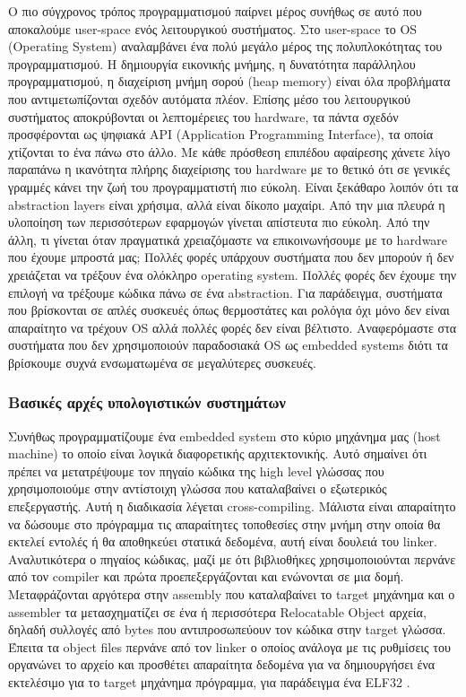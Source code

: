 Ο πιο σύγχρονος τρόπος προγραμματισμού παίρνει μέρος συνήθως σε αυτό
που αποκαλούμε user-space ενός λειτουργικού συστήματος.  Στο
user-space το OS (Operating System) αναλαμβάνει ένα πολύ μεγάλο μέρος
της πολυπλοκότητας του προγραμματισμού. Η δημιουργία εικονικής μνήμης,
η δυνατότητα παράλληλου προγραμματισμού, η διαχείριση μνήμη σορού
(heap memory) είναι όλα προβλήματα που αντιμετωπίζονται σχεδόν
αυτόματα πλέον. Επίσης μέσο του λειτουργικού συστήματος αποκρύβονται
οι λεπτομέρειες του hardware, τα πάντα σχεδόν προσφέρονται ως ψηφιακά
API (Application Programming Interface), τα οποία χτίζονται το ένα
πάνω στο άλλο.  Με κάθε πρόσθεση επιπέδου αφαίρεσης χάνετε λίγο
παραπάνω η ικανότητα πλήρης διαχείρισης του hardware με το θετικό ότι
σε γενικές γραμμές κάνει την ζωή του προγραμματιστή πιο εύκολη. Είναι
ξεκάθαρο λοιπόν ότι τα abstraction layers είναι χρήσιμα, αλλά είναι
δίκοπο μαχαίρι. Από την μια πλευρά η υλοποίηση των περισσότερων
εφαρμογών γίνεται απίστευτα πιο εύκολη. Από την άλλη, τι γίνεται όταν
πραγματικά χρειαζόμαστε να επικοινωνήσουμε με το hardware που έχουμε
μπροστά μας;
Πολλές φορές υπάρχουν συστήματα που δεν μπορούν ή δεν χρειάζεται
να τρέξουν ένα ολόκληρο operating system. Πολλές φορές δεν έχουμε την
επιλογή να τρέξουμε κώδικα πάνω σε ένα abstraction. Για παράδειγμα,
συστήματα που βρίσκονται σε απλές συσκευές όπως θερμοστάτες και
ρολόγια όχι μόνο δεν είναι απαραίτητο να τρέχουν OS αλλά πολλές φορές
δεν είναι βέλτιστο. 
Αναφερόμαστε στα συστήματα που δεν χρησιμοποιούν παραδοσιακά OS  ως
embedded systems διότι τα βρίσκουμε συχνά ενσωματωμένα σε μεγαλύτερες συσκευές.

\subsubsection{Βασικές αρχές υπολογιστικών συστημάτων}

Συνήθως προγραμματίζουμε ένα embedded system στο κύριο μηχάνημα μας
(host machine) το οποίο είναι λογικά διαφορετικής αρχιτεκτονικής. Αυτό
σημαίνει ότι πρέπει να μετατρέψουμε τον πηγαίο κώδικα της high level
γλώσσας που χρησιμοποιούμε στην αντίστοιχη γλώσσα που καταλαβαίνει ο
εξωτερικός επεξεργαστής. Αυτή η διαδικασία λέγεται
cross-compiling. Μάλιστα είναι απαραίτητο να δώσουμε στο πρόγραμμα τις
απαραίτητες τοποθεσίες στην μνήμη στην οποία θα εκτελεί εντολές ή θα
αποθηκεύει στατικά δεδομένα, αυτή είναι δουλειά του
linker. Αναλυτικότερα ο πηγαίος κώδικας, μαζί
με ότι βιβλιοθήκες χρησιμοποιούνται περνάνε από τον compiler και
πρώτα προεπεξεργάζονται και ενώνονται σε μια δομή.
Μεταφράζονται αργότερα στην assembly που καταλαβαίνει το target
μηχάνημα και ο assembler τα μετασχηματίζει σε ένα ή περισσότερα
Relocatable Object αρχεία, δηλαδή συλλογές από bytes που
αντιπροσωπεύουν τον κώδικα στην target γλώσσα. Έπειτα τα object files
περνάνε από τον linker ο οποίος ανάλογα με τις ρυθμίσεις του οργανώνει
το αρχείο και προσθέτει απαραίτητα δεδομένα για να δημιουργήσει ένα
εκτελέσιμο για το target μηχάνημα πρόγραμμα, για παράδειγμα ένα ELF32 .


